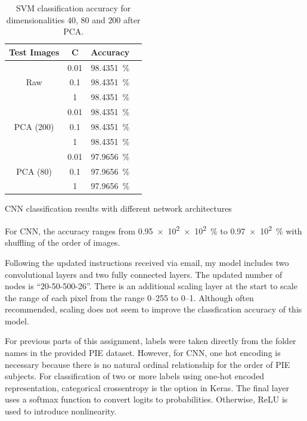 \documentclass[a4paper]{exam}
\newcommand\percentage[2][round-precision = 2]{%
    \qty[round-mode = places,
        scientific-notation = fixed, fixed-exponent = 0,
        output-decimal-marker={.}, #1]{#2e2}{\percent}%
}
\begin{document}
\begin{questions}
    \begin{table}[hb]
        \centering
        \begin{tabular}{ |c|c|c|c| }
            \hline
            Test Images                  & C    & Accuracy                \\
            \hline
            \multirow{3}{4em}{Raw}       & 0.01 & \qty{98.4351}{\percent} \\
                                         & 0.1  & \qty{98.4351}{\percent} \\
                                         & 1    & \qty{98.4351}{\percent} \\
            \hline
            \multirow{3}{4em}{PCA (200)} & 0.01 & \qty{98.4351}{\percent} \\
                                         & 0.1  & \qty{98.4351}{\percent} \\
                                         & 1    & \qty{98.4351}{\percent} \\
            \hline
            \multirow{3}{4em}{PCA (80)}  & 0.01 & \qty{97.9656}{\percent} \\
                                         & 0.1  & \qty{97.9656}{\percent} \\
                                         & 1    & \qty{97.9656}{\percent} \\
            \hline
        \end{tabular}
        \caption{\label{tab:svm}SVM classification accuracy for dimensionalities $40$, $80$ and $200$ after PCA.}
    \end{table}

    \clearpage\question CNN classification results with different network architectures

    For CNN, the accuracy ranges from \percentage{0.95e2}to \percentage{0.97} with shuffling of the order of images.

    Following the updated instructions received via email, my model includes two convolutional layers and two fully connected layers.
    The updated number of nodes is ``20-50-500-26''.
    There is an additional scaling layer at the start to scale the range of each pixel from the range \numrange[range-phrase = --]{0}{255} to \numrange[range-phrase = --]{0}{1}.
    Although often recommended, scaling does not seem to improve the classfication accuracy of this model.

    For previous parts of this assignment, labels were taken directly from the folder names in the provided PIE dataset.
    However, for CNN, one hot encoding is necessary because there is no natural ordinal relationship for the order of PIE subjects.
    For classification of two or more labels using one-hot encoded representation, categorical crossentropy is the option in Keras.
    The final layer uses a softmax function to convert logits to probabilities. Otherwise, ReLU is used to introduce nonlinearity.


\end{questions}
\end{document}
